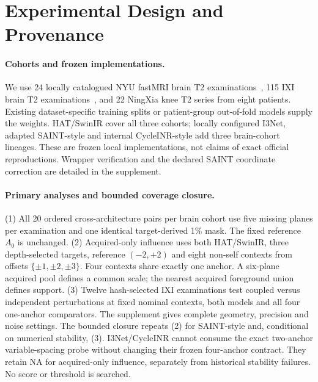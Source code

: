 \documentclass[10pt,twocolumn,letterpaper]{article}
\begin{document}
\section{Experimental Design and Provenance}
\paragraph{Cohorts and frozen implementations.}
We use 24 locally catalogued NYU fastMRI brain T2 examinations~\cite{knoll2020fastmri,muckley2021brain,fastmri_portal}, 115 IXI brain T2 examinations~\cite{ixi_dataset}, and 22 NingXia knee T2 series from eight patients. Existing dataset-specific training splits or patient-group out-of-fold models supply the weights. HAT/SwinIR cover all three cohorts; locally configured I3Net, adapted SAINT-style and internal CycleINR-style add three brain-cohort lineages. These are frozen local implementations, not claims of exact official reproductions. Wrapper verification and the declared SAINT coordinate correction are detailed in the supplement.

\paragraph{Primary analyses and bounded coverage closure.}
(1) All 20 ordered cross-architecture pairs per brain cohort use five missing planes per examination and one identical target-derived 1\% mask. The fixed reference $A_0$ is unchanged. (2) Acquired-only influence uses both HAT/SwinIR, three depth-selected targets, reference $(-2,+2)$ and eight non-self contexts from offsets $\{\pm1,\pm2,\pm3\}$. Four contexts share exactly one anchor. A six-plane acquired pool defines a common scale; the nearest acquired foreground union defines support. (3) Twelve hash-selected IXI examinations test coupled versus independent perturbations at fixed nominal contexts, both models and all four one-anchor comparators. The supplement gives complete geometry, precision and noise settings. The bounded closure repeats (2) for SAINT-style and, conditional on numerical stability, (3). I3Net/CycleINR cannot consume the exact two-anchor variable-spacing probe without changing their frozen four-anchor contract. They retain NA for acquired-only influence, separately from historical stability failures. No score or threshold is searched.
\end{document}
